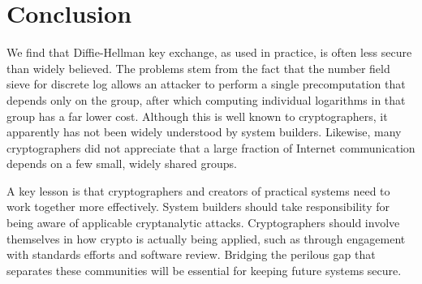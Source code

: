 \section{Conclusion}
\label{sec:conclusion}

We find that Diffie-Hellman key exchange, as used in practice, is often less
secure than widely believed. The problems stem from the fact that the number
field sieve for discrete log allows an attacker to perform a single
precomputation that depends only on the group, after which computing
individual logarithms in that group has a far lower cost. Although this is
well known to cryptographers, it apparently has not been widely understood by
system builders. Likewise, many cryptographers did not appreciate that a
large fraction of Internet communication depends on a few small, widely
shared groups.

A key lesson is that cryptographers and creators of practical systems need to
work together more effectively. System builders should take responsibility
for being aware of applicable cryptanalytic attacks. Cryptographers should
involve themselves in how crypto is actually being applied, such as through
engagement with standards efforts and software review. Bridging the perilous
gap that separates these communities will be essential for keeping future
systems secure.

%
